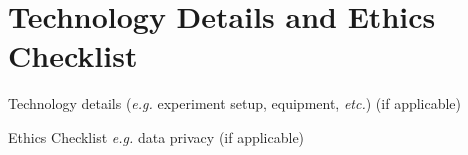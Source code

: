 \chapter{Technology Details and Ethics Checklist} \label{App:TechnologyEthics}

Technology details (\textit{e.g.} experiment setup, equipment, \textit{etc.}) (if applicable)

Ethics Checklist \textit{e.g.} data privacy (if applicable)